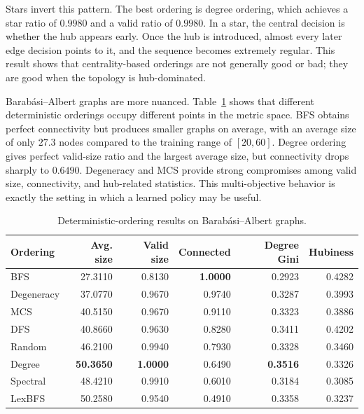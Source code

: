 Stars invert this pattern. The best ordering is degree ordering, which achieves a star ratio of $0.9980$ and a valid ratio of $0.9980$. In a star, the central decision is whether the hub appears early. Once the hub is introduced, almost every later edge decision points to it, and the sequence becomes extremely regular. This result shows that centrality-based orderings are not generally good or bad; they are good when the topology is hub-dominated.

Barab\'asi--Albert graphs are more nuanced. Table~\ref{tab:ba-deterministic-results} shows that different deterministic orderings occupy different points in the metric space. BFS obtains perfect connectivity but produces smaller graphs on average, with an average size of only $27.3$ nodes compared to the training range of $[20,60]$. Degree ordering gives perfect valid-size ratio and the largest average size, but connectivity drops sharply to $0.6490$. Degeneracy and MCS provide strong compromises among valid size, connectivity, and hub-related statistics. This multi-objective behavior is exactly the setting in which a learned policy may be useful.

\begin{table}[H]
\centering
\footnotesize
\begin{tabular}{lrrrrr}
\toprule
\textbf{Ordering} & \textbf{Avg. size} & \textbf{Valid size} & \textbf{Connected} & \textbf{Degree Gini} & \textbf{Hubiness} \\
\midrule
BFS        & 27.3110 & 0.8130 & \textbf{1.0000} & 0.2923 & 0.4282 \\
Degeneracy & 37.0770 & 0.9670 & 0.9740 & 0.3287 & 0.3993 \\
MCS        & 40.5150 & 0.9670 & 0.9110 & 0.3323 & 0.3886 \\
DFS        & 40.8660 & 0.9630 & 0.8280 & 0.3411 & 0.4202 \\
Random     & 46.2100 & 0.9940 & 0.7930 & 0.3328 & 0.3460 \\
Degree     & \textbf{50.3650} & \textbf{1.0000} & 0.6490 & \textbf{0.3516} & 0.3326 \\
Spectral   & 48.4210 & 0.9910 & 0.6010 & 0.3184 & 0.3085 \\
LexBFS     & 50.2580 & 0.9540 & 0.4910 & 0.3358 & 0.3237 \\
\bottomrule
\end{tabular}
\caption{Deterministic-ordering results on Barab\'asi--Albert graphs.}
\label{tab:ba-deterministic-results}
\end{table}

